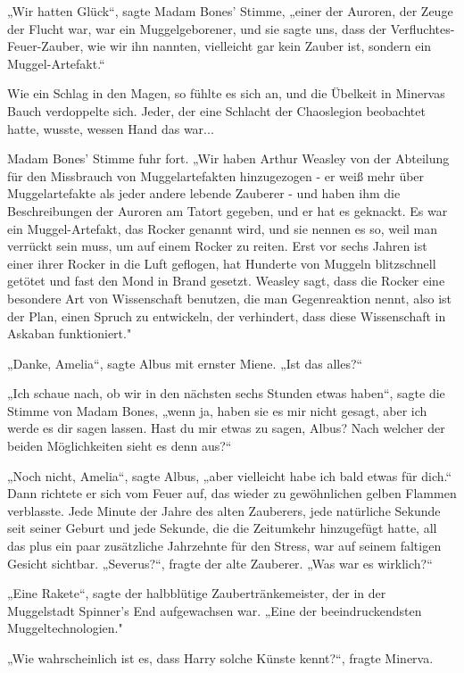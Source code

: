 {„Wir hatten Glück“, sagte Madam Bones' Stimme, „einer der Auroren, der Zeuge der Flucht war, war ein Muggelgeborener, und sie sagte uns, dass der Verfluchtes-Feuer-Zauber, wie wir ihn nannten, vielleicht gar kein Zauber ist, sondern ein Muggel-Artefakt.“

Wie ein Schlag in den Magen, so fühlte es sich an, und die Übelkeit in Minervas Bauch verdoppelte sich. Jeder, der eine Schlacht der Chaoslegion beobachtet hatte, wusste, wessen Hand das war...

Madam Bones' Stimme fuhr fort. „Wir haben Arthur Weasley von der Abteilung für den Missbrauch von Muggelartefakten hinzugezogen - er weiß mehr über Muggelartefakte als jeder andere lebende Zauberer - und haben ihm die Beschreibungen der Auroren am Tatort gegeben, und er hat es geknackt. Es war ein Muggel-Artefakt, das Rocker genannt wird, und sie nennen es so, weil man verrückt sein muss, um auf einem Rocker zu reiten. Erst vor sechs Jahren ist einer ihrer Rocker in die Luft geflogen, hat Hunderte von Muggeln blitzschnell getötet und fast den Mond in Brand gesetzt. Weasley sagt, dass die Rocker eine besondere Art von Wissenschaft benutzen, die man Gegenreaktion nennt, also ist der Plan, einen Spruch zu entwickeln, der verhindert, dass diese Wissenschaft in Askaban funktioniert."

„Danke, Amelia“, sagte Albus mit ernster Miene. „Ist das alles?“

„Ich schaue nach, ob wir in den nächsten sechs Stunden etwas haben“, sagte die Stimme von Madam Bones, „wenn ja, haben sie es mir nicht gesagt, aber ich werde es dir sagen lassen. Hast du mir etwas zu sagen, Albus? Nach welcher der beiden Möglichkeiten sieht es denn aus?“

„Noch nicht, Amelia“, sagte Albus, „aber vielleicht habe ich bald etwas für dich.“ Dann richtete er sich vom Feuer auf, das wieder zu gewöhnlichen gelben Flammen verblasste. Jede Minute der Jahre des alten Zauberers, jede natürliche Sekunde seit seiner Geburt und jede Sekunde, die die Zeitumkehr hinzugefügt hatte, all das plus ein paar zusätzliche Jahrzehnte für den Stress, war auf seinem faltigen Gesicht sichtbar. „Severus?“, fragte der alte Zauberer. „Was war es wirklich?“

„Eine Rakete“, sagte der halbblütige Zaubertränkemeister, der in der Muggelstadt Spinner's End aufgewachsen war. „Eine der beeindruckendsten Muggeltechnologien."

„Wie wahrscheinlich ist es, dass Harry solche Künste kennt?“, fragte Minerva.

}
